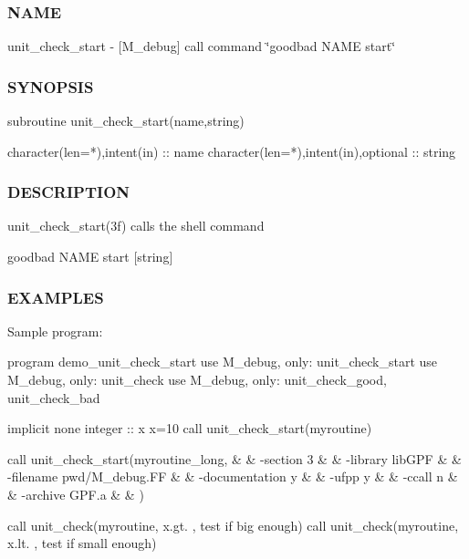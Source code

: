 \subsubsection*{N\+A\+ME}

unit\+\_\+check\+\_\+start -\/ \mbox{[}M\+\_\+debug\mbox{]} call command \char`\"{}goodbad N\+A\+M\+E start\char`\"{} 

\subsubsection*{S\+Y\+N\+O\+P\+S\+IS}

\begin{DoxyVerb}subroutine unit_check_start(name,string)

 character(len=*),intent(in) :: name
 character(len=*),intent(in),optional :: string
\end{DoxyVerb}


\subsubsection*{D\+E\+S\+C\+R\+I\+P\+T\+I\+ON}

\begin{DoxyVerb}unit_check_start(3f) calls the shell command

   goodbad NAME start [string]
\end{DoxyVerb}


\subsubsection*{E\+X\+A\+M\+P\+L\+ES}

Sample program\+:

program demo\+\_\+unit\+\_\+check\+\_\+start use M\+\_\+debug, only\+: unit\+\_\+check\+\_\+start use M\+\_\+debug, only\+: unit\+\_\+check use M\+\_\+debug, only\+: unit\+\_\+check\+\_\+good, unit\+\_\+check\+\_\+bad

implicit none integer \+:\+: x x=10 call unit\+\_\+check\+\_\+start(\textquotesingle{}myroutine\textquotesingle{})

call unit\+\_\+check\+\_\+start(\textquotesingle{}myroutine\+\_\+long\textquotesingle{},\textquotesingle{} \& \& -\/section 3 \& \& -\/library lib\+G\+PF \& \& -\/filename {\ttfamily pwd}/\+M\+\_\+debug.FF \& \& -\/documentation y \& \& -\/ufpp y \& \& -\/ccall n \& \& -\/archive G\+P\+F.\+a \& \& \textquotesingle{})

call unit\+\_\+check(\textquotesingle{}myroutine\textquotesingle{}, x.\+gt. , \textquotesingle{}test if big enough\textquotesingle{}) call unit\+\_\+check(\textquotesingle{}myroutine\textquotesingle{}, x.\+lt. , \textquotesingle{}test if small enough\textquotesingle{})

